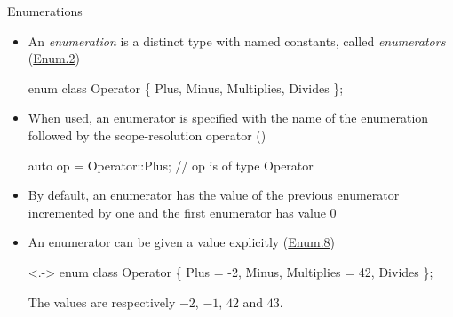 \begin{frame}[fragile]{Enumerations}

  \begin{itemize}[<+->]
  \item An \textit{enumeration} is a distinct type with named constants, called
    \textit{enumerators} (\href{https://isocpp.github.io/CppCoreGuidelines/CppCoreGuidelines#enum2-use-enumerations-to-represent-sets-of-related-named-constants}{Enum.2})

  \begin{codeblock}
enum class Operator \{ Plus, Minus, Multiplies, Divides \};\end{codeblock}

  \item When used, an enumerator is specified with the name of the enumeration
    followed by the scope-resolution operator (\code{::})

    \begin{codeblock}
auto op = Operator::Plus; // op is of type Operator\end{codeblock}

  \item By default, an enumerator has the value of the previous enumerator
    incremented by one and the first enumerator has value $0$
  \item An enumerator can be given a value explicitly (\href{https://isocpp.github.io/CppCoreGuidelines/CppCoreGuidelines#enum8-specify-enumerator-values-only-when-necessary}{Enum.8})
    \begin{codeblock}<.->{
enum class Operator \{ Plus = -2, Minus, Multiplies = 42, Divides \};}\end{codeblock}
    The values are respectively $-2$, $-1$, $42$ and $43$.

  \end{itemize}
\end{frame}

